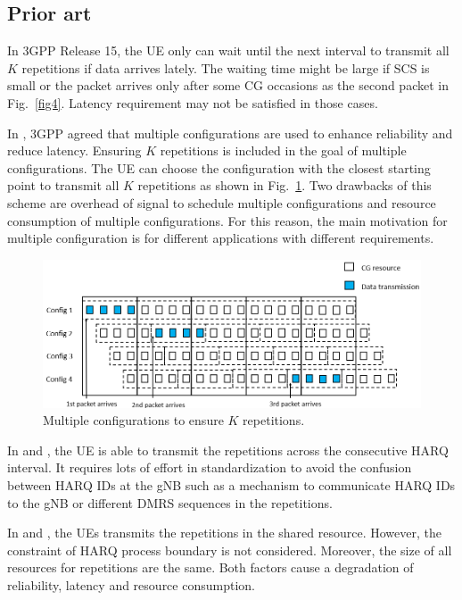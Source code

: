 \documentclass{ieeeaccess}
\begin{document}
\subsection{Prior art}\label{IIIBN}
In 3GPP Release 15, the UE only can wait until the next interval to transmit all $K$ repetitions if data arrives lately. The waiting time might be large if SCS is small or the packet arrives only after some CG occasions as the second packet in Fig.~\ref{fig4}. Latency requirement may not be satisfied in those cases.

In \cite{ref7}, 3GPP agreed that multiple configurations are used to enhance reliability and reduce latency. Ensuring $K$ repetitions is included in the goal of multiple configurations. The UE can choose the configuration with the closest starting point to transmit all $K$ repetitions as shown in Fig.~\ref{fig14}. Two drawbacks of this scheme are overhead of signal to schedule multiple configurations and resource consumption of multiple configurations. For this reason, the main motivation for multiple configuration is for different applications with different requirements.

\begin{figure}[htbp]
\centerline{\includegraphics[scale=0.32]{fig14.PNG}}
\caption{Multiple configurations to ensure $K$ repetitions.}
\label{fig14}
\vspace{-4mm}
\end{figure}


In \cite{ref8} and \cite{ref9}, the UE is able to transmit the repetitions across the consecutive HARQ interval. It requires lots of effort in standardization to avoid the confusion between HARQ IDs at the gNB such as a mechanism to communicate HARQ IDs to the gNB or different DMRS sequences in the repetitions.

In \cite{ref10} and \cite{ref11}, the UEs transmits the repetitions in the shared resource. However, the constraint of HARQ process boundary is not considered. Moreover, the size of all resources for repetitions are the same. Both factors cause a degradation of reliability, latency and resource consumption.
\end{document}
